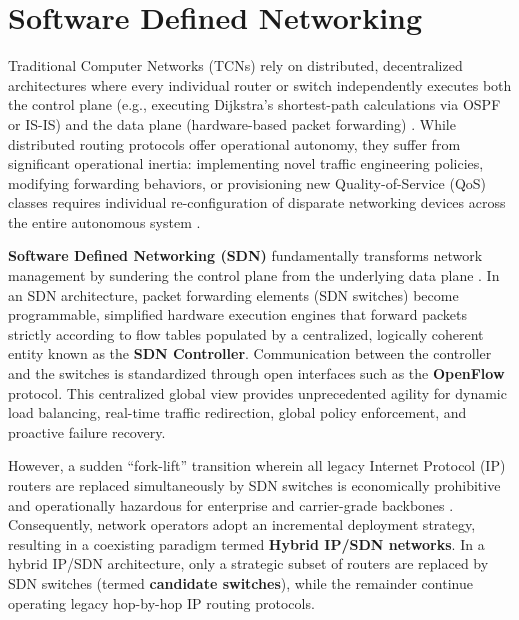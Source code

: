 \chapter{Software Defined Networking}
\label{sec:chapter_sdn}

Traditional Computer Networks (TCNs) rely on distributed, decentralized architectures where every individual router or switch independently executes both the control plane (e.g., executing Dijkstra's shortest-path calculations via OSPF or IS-IS) and the data plane (hardware-based packet forwarding) \cite{tanenbaum2011computer, bertsekas1992data, kumar2004communication}. While distributed routing protocols offer operational autonomy, they suffer from significant operational inertia: implementing novel traffic engineering policies, modifying forwarding behaviors, or provisioning new Quality-of-Service (QoS) classes requires individual re-configuration of disparate networking devices across the entire autonomous system \cite{vuppalapati2021modeling}.

\textbf{Software Defined Networking (SDN)} fundamentally transforms network management by sundering the control plane from the underlying data plane \cite{vuppalapati2022minimum, vuppalapati2025candidate}. In an SDN architecture, packet forwarding elements (SDN switches) become programmable, simplified hardware execution engines that forward packets strictly according to flow tables populated by a centralized, logically coherent entity known as the \textbf{SDN Controller}. Communication between the controller and the switches is standardized through open interfaces such as the \textbf{OpenFlow} protocol. This centralized global view provides unprecedented agility for dynamic load balancing, real-time traffic redirection, global policy enforcement, and proactive failure recovery.

However, a sudden ``fork-lift'' transition wherein all legacy Internet Protocol (IP) routers are replaced simultaneously by SDN switches is economically prohibitive and operationally hazardous for enterprise and carrier-grade backbones \cite{vuppalapati2022minimum}. Consequently, network operators adopt an incremental deployment strategy, resulting in a coexisting paradigm termed \textbf{Hybrid IP/SDN networks}. In a hybrid IP/SDN architecture, only a strategic subset of routers are replaced by SDN switches (termed \textbf{candidate switches}), while the remainder continue operating legacy hop-by-hop IP routing protocols.

